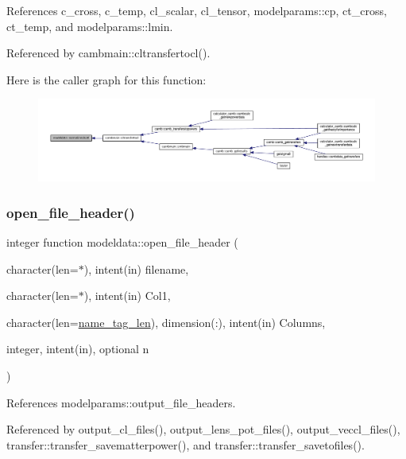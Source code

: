 References c\+\_\+cross, c\+\_\+temp, cl\+\_\+scalar, cl\+\_\+tensor, modelparams\+::cp, ct\+\_\+cross, ct\+\_\+temp, and modelparams\+::lmin.



Referenced by cambmain\+::cltransfertocl().

Here is the caller graph for this function\+:
\nopagebreak
\begin{figure}[H]
\begin{center}
\leavevmode
\includegraphics[width=350pt]{namespacemodeldata_aec1c8c9bdd2a65d1f5eec6cb91f7afa1_icgraph}
\end{center}
\end{figure}
\mbox{\label{namespacemodeldata_abab5acd24b50e4d884e84682fed17a52}} 
\subsubsection{\texorpdfstring{open\+\_\+file\+\_\+header()}{open\_file\_header()}}
{\footnotesize\ttfamily integer function modeldata\+::open\+\_\+file\+\_\+header (\begin{DoxyParamCaption}\item[{character(len=$\ast$), intent(in)}]{filename,  }\item[{character(len=$\ast$), intent(in)}]{Col1,  }\item[{character(len=\mbox{\hyperlink{namespacemodeldata_a2ead755d89390eb003edcde34ebf2c99}{name\+\_\+tag\+\_\+len}}), dimension(\+:), intent(in)}]{Columns,  }\item[{integer, intent(in), optional}]{n }\end{DoxyParamCaption})}



References modelparams\+::output\+\_\+file\+\_\+headers.



Referenced by output\+\_\+cl\+\_\+files(), output\+\_\+lens\+\_\+pot\+\_\+files(), output\+\_\+veccl\+\_\+files(), transfer\+::transfer\+\_\+savematterpower(), and transfer\+::transfer\+\_\+savetofiles().


